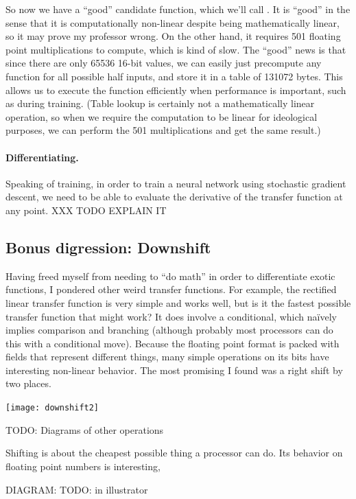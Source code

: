 \documentclass[twocolumn]{article}
\begin{document}
So now we have a ``good'' candidate function, which we'll call \gradone.
It is ``good'' in the sense that it is computationally non-linear
despite being mathematically linear, so it may prove my professor
wrong. On the other hand, it requires 501 floating point
multiplications to compute, which is kind of slow. The ``good'' news
is that since there are only 65536 16-bit values, we can easily just
precompute any function for all possible half inputs, and store it in
a table of 131072 bytes. This allows us to execute the function
efficiently when performance is important, such as during training.
(Table lookup is certainly not a mathematically linear operation, so
when we require the computation to be linear for ideological purposes,
we can perform the 501 multiplications and get the same result.)

\paragraph{Differentiating.}
Speaking of training, in order to train a neural network using
stochastic gradient descent, we need to be able to evaluate the
derivative of the transfer function at any point.
 XXX TODO EXPLAIN IT

\subsection{Bonus digression: Downshift}
Having freed myself from needing to ``do math'' in order to
differentiate exotic functions, I pondered other weird transfer
functions. For example, the rectified linear transfer function is very
simple and works well, but is it the fastest possible transfer
function that might work? It does involve a conditional, which na\"ively
implies comparison and branching (although probably most processors
can do this with a conditional move). Because the floating point
format is packed with fields that represent different things, many
simple operations on its bits have interesting non-linear behavior.
The most promising I found was a right shift by two places.

\begin{center}
\texttt{[image: downshift2]}
\end{center}

TODO: Diagrams of other operations

Shifting is about the cheapest possible thing a processor can do. Its behavior on floating point numbers is interesting,

DIAGRAM: TODO: in illustrator
\end{document}
